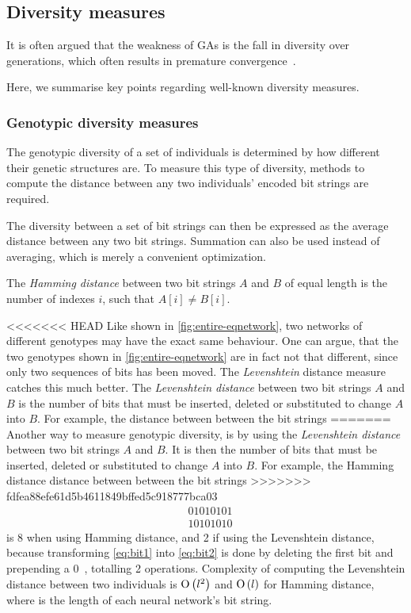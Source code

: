 \subsection{Diversity measures}
\label{sec:diversitymeasures}
It is often argued that the weakness of GAs is the fall in diversity over generations, which often results in premature convergence~\cite{diaz2007empirical, 1266373,Zitzler00comparisonof}.

Here, we summarise key points regarding well-known diversity measures. %

\subsubsection{Genotypic diversity measures}
The genotypic diversity of a set of individuals is determined by how different their genetic structures are. To measure this type of diversity, methods to compute the distance between any two individuals' encoded bit strings are required.

The diversity between a set of bit strings can then be expressed as the average distance between any two bit strings. Summation can also be used instead of averaging, which is merely a convenient optimization.

The \emph{Hamming distance} between two bit strings $A$ and $B$ of equal length is the number of indexes $i$, such that $A[i] \neq B[i]$.

<<<<<<< HEAD
Like shown in \cref{fig:entire-eqnetwork}, two networks of different genotypes may have the exact same behaviour.
One can argue, that the two genotypes shown in \cref{fig:entire-eqnetwork} are in fact not that different, since only two sequences of bits has been moved. 
The \emph{Levenshtein} distance measure catches this much better. The \emph{Levenshtein distance} between two bit strings $A$ and $B$ is the number of bits that must be inserted, deleted or substituted to change $A$ into $B$. For example, the distance between between the bit strings
=======
Another way to measure genotypic diversity, is by using the \emph{Levenshtein distance} between two bit strings $A$ and $B$. It is then the number of bits that must be inserted, deleted or substituted to change $A$ into $B$. For example, the Hamming distance distance between between the bit strings
>>>>>>> fdfea88efe61d5b4611849bffed5c918777bca03
%
\begin{align}
&01010101\label{eq:bit1} \\
&10101010\label{eq:bit2}
\end{align}
%
is 8 when using Hamming distance, and 2 if using the Levenshtein distance, because transforming \cref{eq:bit1} into \cref{eq:bit2} is done by deleting the first bit and prepending a $0$~\cite{1250187}, totalling 2 operations. Complexity of computing the Levenshtein distance between two individuals is $\operatorname{O}\left(l^2\right)$ and $\operatorname{O}\left(l\right)$ for Hamming distance, where \bitstringl{} is the length of each neural network's bit string.

